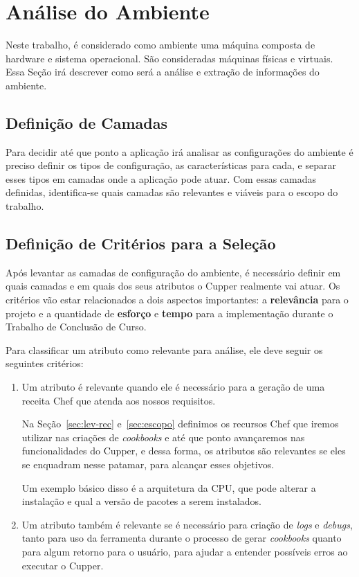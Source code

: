 \section{Análise do Ambiente}

Neste trabalho, é considerado como ambiente uma máquina composta
de hardware e sistema operacional. São consideradas máquinas físicas
e virtuais. Essa Seção irá descrever como será a análise e extração
de informações do ambiente.

\subsection{Definição de Camadas}

Para decidir até que ponto a aplicação irá analisar as configurações
do ambiente é preciso definir os tipos de configuração, as características para
cada, e separar esses tipos em camadas onde a aplicação pode atuar.
Com essas camadas definidas, identifica-se quais camadas são relevantes e viáveis
para o escopo do trabalho.


\subsection{Definição de Critérios para a Seleção}
\label{sec:defcritcamada}
Após levantar as camadas de configuração do ambiente, é necessário definir em
quais camadas e em quais dos seus atributos o Cupper realmente vai atuar. 
Os critérios vão estar relacionados a dois aspectos importantes: a \textbf{relevância} 
para o projeto e a quantidade de \textbf{esforço} e \textbf{tempo} para a implementação durante
o Trabalho de Conclusão de Curso.

Para classificar um atributo como relevante para análise, ele deve seguir os
seguintes critérios:

\begin{enumerate}
\item Um atributo é relevante quando ele é necessário para a geração de uma
receita Chef que atenda aos nossos requisitos. 

Na Seção~\ref{sec:lev-rec} e~\ref{sec:escopo} definimos os recursos Chef
que iremos utilizar nas criações de \textit{cookbooks} e até que ponto 
avançaremos nas funcionalidades do Cupper, e dessa forma, os atributos
são relevantes se eles se enquadram nesse patamar, para alcançar esses objetivos.

Um exemplo básico disso é a arquitetura da CPU, que pode alterar a instalação
e qual a versão de pacotes a serem instalados.

\item Um atributo também é relevante se é necessário para criação de \textit{logs} 
e \textit{debugs}, tanto para uso da ferramenta durante o processo de gerar 
\textit{cookbooks} quanto para algum retorno para o usuário, para ajudar 
a entender possíveis erros ao executar
o Cupper.
\end{enumerate}


